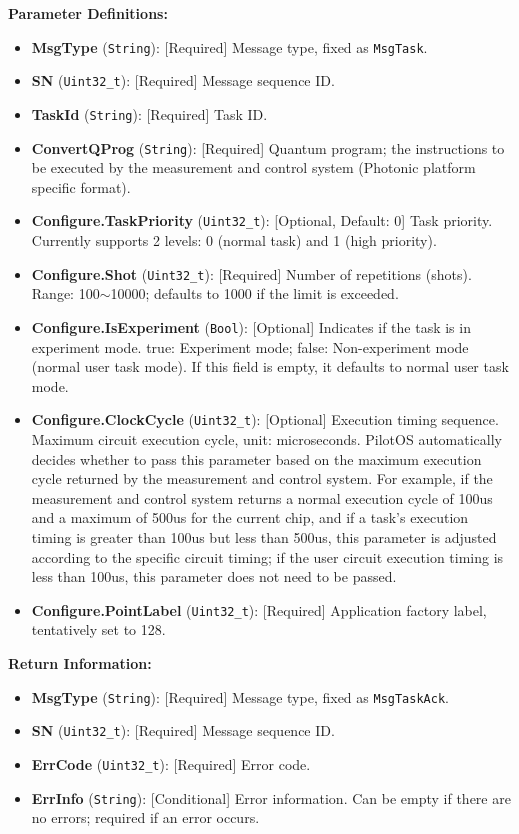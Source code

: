 \documentclass[12pt, a4paper]{article}
\begin{document}
\textbf{Parameter Definitions:}
\begin{itemize}
    \item \textbf{MsgType} (\texttt{String}): [Required] Message type, fixed as \texttt{MsgTask}.
    \item \textbf{SN} (\texttt{Uint32\_t}): [Required] Message sequence ID.
    \item \textbf{TaskId} (\texttt{String}): [Required] Task ID.
    \item \textbf{ConvertQProg} (\texttt{String}): [Required] Quantum program; the instructions to be executed by the measurement and control system (Photonic platform specific format).
    \item \textbf{Configure.TaskPriority} (\texttt{Uint32\_t}): [Optional, Default: 0] Task priority. Currently supports 2 levels: 0 (normal task) and 1 (high priority).
    \item \textbf{Configure.Shot} (\texttt{Uint32\_t}): [Required] Number of repetitions (shots). Range: 100$\sim$10000; defaults to 1000 if the limit is exceeded.
    \item \textbf{Configure.IsExperiment} (\texttt{Bool}): [Optional] Indicates if the task is in experiment mode. true: Experiment mode; false: Non-experiment mode (normal user task mode). If this field is empty, it defaults to normal user task mode.
    \item \textbf{Configure.ClockCycle} (\texttt{Uint32\_t}): [Optional] Execution timing sequence. Maximum circuit execution cycle, unit: microseconds. PilotOS automatically decides whether to pass this parameter based on the maximum execution cycle returned by the measurement and control system. For example, if the measurement and control system returns a normal execution cycle of 100us and a maximum of 500us for the current chip, and if a task's execution timing is greater than 100us but less than 500us, this parameter is adjusted according to the specific circuit timing; if the user circuit execution timing is less than 100us, this parameter does not need to be passed.
    \item \textbf{Configure.PointLabel} (\texttt{Uint32\_t}): [Required] Application factory label, tentatively set to 128.
\end{itemize}

\textbf{Return Information:}
\begin{itemize}
    \item \textbf{MsgType} (\texttt{String}): [Required] Message type, fixed as \texttt{MsgTaskAck}.
    \item \textbf{SN} (\texttt{Uint32\_t}): [Required] Message sequence ID.
    \item \textbf{ErrCode} (\texttt{Uint32\_t}): [Required] Error code.
    \item \textbf{ErrInfo} (\texttt{String}): [Conditional] Error information. Can be empty if there are no errors; required if an error occurs.
\end{itemize}
\end{document}
